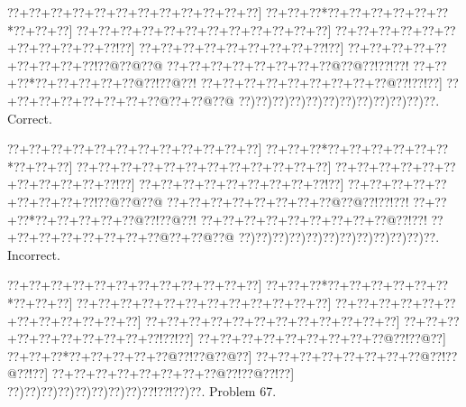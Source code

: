 \documentclass[a5paper]{article}
\begin{document}
\begin{center}
{\goo
\0??+\0??+\0??+\0??+\0??+\0??+\0??+\0??+\0??+\0??+\0??+\0??]
\0??+\0??+\0??*\0??+\0??+\0??+\0??+\0??+\0??*\0??+\0??+\0??]
\0??+\0??+\0??+\0??+\0??+\0??+\0??+\0??+\0??+\0??+\0??+\0??]
\0??+\0??+\0??+\0??+\0??+\0??+\0??+\0??+\0??+\0??+\0??!\0??]
\0??+\0??+\0??+\0??+\0??+\0??+\0??+\0??+\0??!\0??]
\0??+\0??+\0??+\0??+\0??+\0??+\0??+\0??+\0??!\0??@\0??@\0??@
\0??+\0??+\0??+\0??+\0??+\0??+\0??+\0??@\0??@\0??!\0??!\0??!
\0??+\0??+\0??*\0??+\0??+\0??+\0??+\0??@\0??!\0??@\0??!
\0??+\0??+\0??+\0??+\0??+\0??+\0??+\0??+\0??@\0??!\0??!\0??]
\0??+\0??+\0??+\0??+\0??+\0??+\0??+\0??@\0??+\0??@\0??@
\0??)\0??)\0??)\0??)\0??)\0??)\0??)\0??)\0??)\0??)\0??)\0??.
}
Correct. 

\end{center}
\begin{center}
{\goo
\0??+\0??+\0??+\0??+\0??+\0??+\0??+\0??+\0??+\0??+\0??+\0??]
\0??+\0??+\0??*\0??+\0??+\0??+\0??+\0??+\0??*\0??+\0??+\0??]
\0??+\0??+\0??+\0??+\0??+\0??+\0??+\0??+\0??+\0??+\0??+\0??]
\0??+\0??+\0??+\0??+\0??+\0??+\0??+\0??+\0??+\0??+\0??!\0??]
\0??+\0??+\0??+\0??+\0??+\0??+\0??+\0??+\0??!\0??]
\0??+\0??+\0??+\0??+\0??+\0??+\0??+\0??+\0??!\0??@\0??@\0??@
\0??+\0??+\0??+\0??+\0??+\0??+\0??+\0??@\0??@\0??!\0??!\0??!
\0??+\0??+\0??*\0??+\0??+\0??+\0??+\0??@\0??!\0??@\0??!
\0??+\0??+\0??+\0??+\0??+\0??+\0??+\0??+\0??@\0??!\0??!
\0??+\0??+\0??+\0??+\0??+\0??+\0??+\0??@\0??+\0??@\0??@
\0??)\0??)\0??)\0??)\0??)\0??)\0??)\0??)\0??)\0??)\0??)\0??.
}
Incorrect. 

\end{center}
\newpage
\begin{center}
{\goo
\0??+\0??+\0??+\0??+\0??+\0??+\0??+\0??+\0??+\0??+\0??+\0??]
\0??+\0??+\0??*\0??+\0??+\0??+\0??+\0??+\0??*\0??+\0??+\0??]
\0??+\0??+\0??+\0??+\0??+\0??+\0??+\0??+\0??+\0??+\0??+\0??]
\0??+\0??+\0??+\0??+\0??+\0??+\0??+\0??+\0??+\0??+\0??+\0??]
\0??+\0??+\0??+\0??+\0??+\0??+\0??+\0??+\0??+\0??+\0??+\0??]
\0??+\0??+\0??+\0??+\0??+\0??+\0??+\0??+\0??+\0??!\0??!\0??]
\0??+\0??+\0??+\0??+\0??+\0??+\0??+\0??+\0??@\0??!\0??@\0??]
\0??+\0??+\0??*\0??+\0??+\0??+\0??+\0??@\0??!\0??@\0??@\0??]
\0??+\0??+\0??+\0??+\0??+\0??+\0??+\0??@\0??!\0??@\0??!\0??]
\0??+\0??+\0??+\0??+\0??+\0??+\0??+\0??@\0??!\0??@\0??!\0??]
\0??)\0??)\0??)\0??)\0??)\0??)\0??)\0??)\0??!\0??!\0??)\0??.
}
Problem 67.

\end{center}
\end{document}
